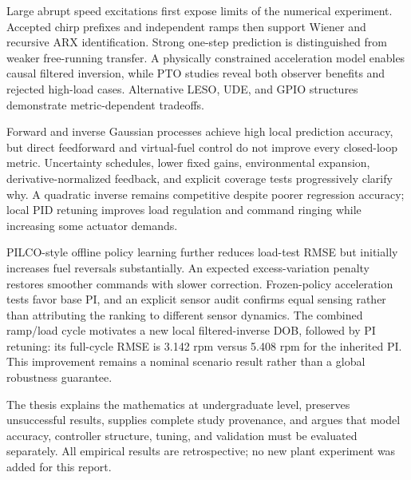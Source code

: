 \documentclass[11pt,a4paper,oneside]{report}
\begin{document}
Large abrupt speed excitations first expose limits of the numerical experiment. Accepted chirp prefixes and independent ramps then support Wiener and recursive ARX identification. Strong one-step prediction is distinguished from weaker free-running transfer. A physically constrained acceleration model enables causal filtered inversion, while PTO studies reveal both observer benefits and rejected high-load cases. Alternative LESO, UDE, and GPIO structures demonstrate metric-dependent tradeoffs.

Forward and inverse Gaussian processes achieve high local prediction accuracy, but direct feedforward and virtual-fuel control do not improve every closed-loop metric. Uncertainty schedules, lower fixed gains, environmental expansion, derivative-normalized feedback, and explicit coverage tests progressively clarify why. A quadratic inverse remains competitive despite poorer regression accuracy; local PID retuning improves load regulation and command ringing while increasing some actuator demands.

PILCO-style offline policy learning further reduces load-test RMSE but initially increases fuel reversals substantially. An expected excess-variation penalty restores smoother commands with slower correction. Frozen-policy acceleration tests favor base PI, and an explicit sensor audit confirms equal sensing rather than attributing the ranking to different sensor dynamics. The combined ramp/load cycle motivates a new local filtered-inverse DOB, followed by PI retuning: its full-cycle RMSE is 3.142 rpm versus 5.408 rpm for the inherited PI. This improvement remains a nominal scenario result rather than a global robustness guarantee.

The thesis explains the mathematics at undergraduate level, preserves unsuccessful results, supplies complete study provenance, and argues that model accuracy, controller structure, tuning, and validation must be evaluated separately. All empirical results are retrospective; no new plant experiment was added for this report.
\end{document}
